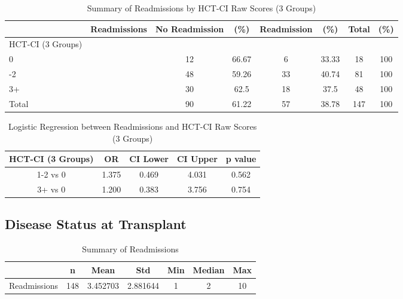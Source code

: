 \documentclass[12pt,]{article}
\begin{document}
\pagebreak

\begin{table}[!h]

\caption{\label{tab:unnamed-chunk-38}Summary of Readmissions by HCT-CI Raw Scores (3 Groups)}
\centering
\begin{tabular}{>{\centering\arraybackslash}p{5cm}ccccccc}
\toprule
  & Readmissions & No Readmission & (\%) & Readmission & (\%) & Total & (\%)\\
\midrule
HCT-CI (3 Groups) &  &  &  &  &  &  & \\
\rowcolor[HTML]{E3E5E7}  0 &  & 12 & 66.67 & 6 & 33.33 & 18 & 100\\
1-2 &  & 48 & 59.26 & 33 & 40.74 & 81 & 100\\
\rowcolor[HTML]{E3E5E7}  3+ &  & 30 & 62.5 & 18 & 37.5 & 48 & 100\\
Total &  & 90 & 61.22 & 57 & 38.78 & 147 & 100\\
\bottomrule
\end{tabular}
\end{table}

\begin{table}[!h]

\caption{\label{tab:unnamed-chunk-38}Logistic Regression between Readmissions and HCT-CI Raw Scores (3 Groups)}
\centering
\begin{tabular}{ccccc}
\toprule
HCT-CI (3 Groups) & OR & CI Lower & CI Upper & p value\\
\midrule
1-2 vs 0 & 1.375 & 0.469 & 4.031 & 0.562\\
\rowcolor[HTML]{E3E5E7}  3+ vs 0 & 1.200 & 0.383 & 3.756 & 0.754\\
\bottomrule
\end{tabular}
\end{table}

\pagebreak 

\subsection{Disease Status at
Transplant}\label{disease-status-at-transplant}

\begin{table}[!h]

\caption{\label{tab:unnamed-chunk-39}Summary of Readmissions}
\centering
\begin{tabular}{>{\raggedright\arraybackslash}p{5cm}cccccc}
\toprule
  & n & Mean & Std & Min & Median & Max\\
\midrule
\rowcolor{white}  Readmissions & 148 & 3.452703 & 2.881644 & 1 & 2 & 10\\
\bottomrule
\end{tabular}
\end{table}
\end{document}
